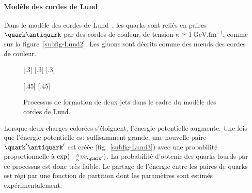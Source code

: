 \paragraph{Modèle des cordes de Lund}\label{chapter-MSSM-formation_jets-subsec-hadronisation-subsubsec-Lund}
Dans le modèle des cordes de Lund~\cite{Andersson_parton_fragmentation}, les quarks sont reliés en paires $\quark\antiquark$ par des \og cordes \fg{} de couleur, de tension $\kappa \simeq \SI{1}{\GeV.\femto\meter^{-1}}$, comme sur la figure~\ref{subfig-Lund2}. Les gluons sont décrits comme des nœuds des cordes de couleur.
\begin{figure}[h]
\centering
{}[.3\textwidth]
{}
\hfill
{}[.3\textwidth]
{}
\hfill
{}[.3\textwidth]
{}

\vspace{\baselineskip}

[.45\textwidth]
{}
\hfill
{}[.45\textwidth]
{}

\caption[Formation de jets dans le cadre du modèle des cordes de Lund.]{Processus de formation de deux jets dans le cadre du modèle des cordes de Lund.}
\label{fig-Lund}
\end{figure}
\par Lorsque deux charges colorées s'éloignent, l'énergie potentielle augmente.
Une fois que l'énergie potentielle est suffisamment grande, une nouvelle paire $\quark'\antiquark'$ est créée (fig.~\ref{subfig-Lund3}) avec une probabilité proportionnelle à $\exp(-\frac{\pi}{\kappa} m_{\quark'})$.
La probabilité d'obtenir des quarks lourds par ce processus est donc très faible.
Le partage de l'énergie entre les paires de quarks est régi par une fonction de partition dont les paramètres sont estimés expérimentalement.

